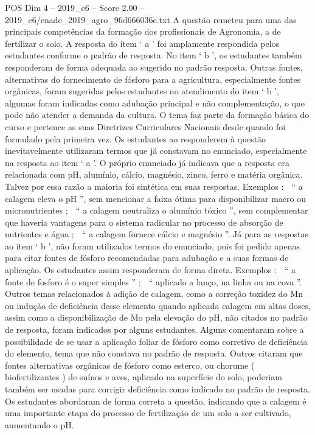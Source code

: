 \begin{textsample}{POS Dim 4 – 2019\_c6 – Score 2.00 – 2019\_c6/enade\_2019\_agro\_96d666036e.txt}
A questão remeteu para uma das principais competências da formação dos profissionais de Agronomia, a de fertilizar o solo.
A resposta do item ‘ a ’ foi amplamente respondida pelos estudantes conforme o padrão de resposta.
No item ‘ b ’, os estudantes também responderam de forma adequada ao sugerido no padrão resposta.
Outras fontes, alternativas do fornecimento de fósforo para a agricultura, especialmente fontes orgânicas, foram sugeridas pelos estudantes no atendimento do item ‘ b ’, algumas foram indicadas como adubação principal e não complementação, o que pode não atender a demanda da cultura.
O tema faz parte da formação básica do curso e pertence as suas Diretrizes Curriculares Nacionais desde quando foi formulado pela primeira vez.
Os estudantes ao responderem à questão inevitavelmente utilizaram termos que já constavam no enunciado, especialmente na resposta ao item ‘ a ’.
O próprio enunciado já indicava que a resposta era relacionada com pH, alumínio, cálcio, magnésio, zinco, ferro e matéria orgânica.
Talvez por essa razão a maioria foi sintética em suas respostas.
Exemplos :  “ a calagem eleva o pH ”, sem mencionar a faixa ótima para disponibilizar macro ou micronutrientes ;  “ a calagem neutraliza o alumínio tóxico ”, sem complementar que haveria vantagens para o sistema radicular no processo de absorção de nutrientes e água ;  “ a calagem fornece cálcio e magnésio ”.
Já para as respostas ao item ‘ b ’, não foram utilizados termos do enunciado, pois foi pedido apenas para citar fontes de fósforo recomendadas para adubação e a suas formas de aplicação.
Os estudantes assim responderam de forma direta.
Exemplos :  “ a fonte de fosforo é o super simples ” ;  “ aplicado a lanço, na linha ou na cova ”.
Outros temas relacionados à adição de calagem, como a correção toxidez do Mn ou indução de deficiência desse elemento quando aplicada calagem em altas doses, assim como a disponibilização de Mo pela elevação do pH, não citados no padrão de resposta, foram indicados por alguns estudantes.
Alguns comentaram sobre a possibilidade de se usar a aplicação foliar de fósforo como corretivo de deficiência do elemento, tema que não constava no padrão de resposta.
Outros citaram que fontes alternativas orgânicas de fósforo como esterco, ou chorume ( biofertilizantes ) de suínos e aves, aplicado na superfície do solo, poderiam também ser usadas para corrigir deficiência como indicado no padrão de resposta.
Os estudantes abordaram de forma correta a questão, indicando que a calagem é uma importante etapa do processo de fertilização de um solo a ser cultivado, aumentando o pH.

\end{textsample}
